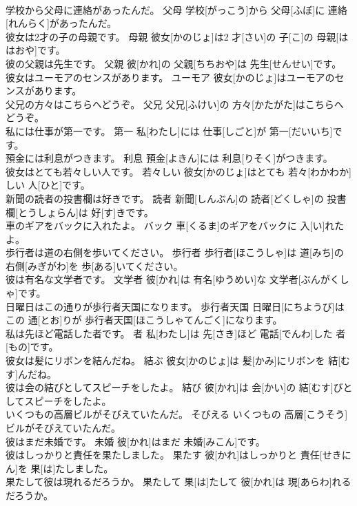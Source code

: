 \documentclass[8pt]{extreport}
\begin{document}
\begin{CJK}{UTF8}{min}
\\	学校から父母に連絡があったんだ。	父母	学校[がっこう]から 父母[ふぼ]に 連絡[れんらく]があったんだ。	
\\	彼女は2才の子の母親です。	母親	彼女[かのじょ]は2 才[さい]の 子[こ]の 母親[ははおや]です。	
\\	彼の父親は先生です。	父親	彼[かれ]の 父親[ちちおや]は 先生[せんせい]です。	
\\	彼女はユーモアのセンスがあります。	ユーモア	彼女[かのじょ]はユーモアのセンスがあります。	
\\	父兄の方々はこちらへどうぞ。	父兄	父兄[ふけい]の 方々[かたがた]はこちらへどうぞ。	
\\	私には仕事が第一です。	第一	私[わたし]には 仕事[しごと]が 第一[だいいち]です。	
\\	預金には利息がつきます。	利息	預金[よきん]には 利息[りそく]がつきます。	
\\	彼女はとても若々しい人です。	若々しい	彼女[かのじょ]はとても 若々[わかわか]しい 人[ひと]です。	
\\	新聞の読者の投書欄は好きです。	読者	新聞[しんぶん]の 読者[どくしゃ]の 投書欄[とうしょらん]は 好[す]きです。	
\\	車のギアをバックに入れたよ。	バック	車[くるま]のギアをバックに 入[い]れたよ。	
\\	歩行者は道の右側を歩いてください。	歩行者	歩行者[ほこうしゃ]は 道[みち]の 右側[みぎがわ]を 歩[ある]いてください。	
\\	彼は有名な文学者です。	文学者	彼[かれ]は 有名[ゆうめい]な 文学者[ぶんがくしゃ]です。	
\\	日曜日はこの通りが歩行者天国になります。	歩行者天国	日曜日[にちようび]はこの 通[とお]りが 歩行者天国[ほこうしゃてんごく]になります。	
\\	私は先ほど電話した者です。	者	私[わたし]は 先[さき]ほど 電話[でんわ]した 者[もの]です。	
\\	彼女は髪にリボンを結んだね。	結ぶ	彼女[かのじょ]は 髪[かみ]にリボンを 結[むす]んだね。	
\\	彼は会の結びとしてスピーチをしたよ。	結び	彼[かれ]は 会[かい]の 結[むす]びとしてスピーチをしたよ。	
\\	いくつもの高層ビルがそびえていたんだ。	そびえる	いくつもの 高層[こうそう]ビルがそびえていたんだ。	
\\	彼はまだ未婚です。	未婚	彼[かれ]はまだ 未婚[みこん]です。	
\\	彼はしっかりと責任を果たしました。	果たす	彼[かれ]はしっかりと 責任[せきにん]を 果[は]たしました。	
\\	果たして彼は現れるだろうか。	果たして	果[は]たして 彼[かれ]は 現[あらわ]れるだろうか。	

\end{CJK}
\end{document}
